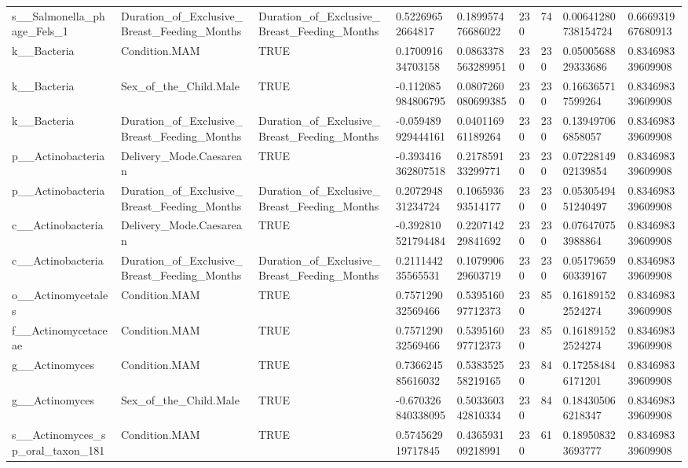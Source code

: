 \begin{longtable}{lllllllll}
s\_\_Salmonella\_phage\_Fels\_1 & Duration\_of\_Exclusive\_Breast\_Feeding\_Months & Duration\_of\_Exclusive\_Breast\_Feeding\_Months & 0.52269652664817 & 0.189957476686022 & 230 & 74 & 0.00641280738154724 & 0.666931967680913 \\
k\_\_Bacteria & Condition.MAM & TRUE & 0.170091634703158 & 0.0863378563289951 & 230 & 230 & 0.0500568829333686 & 0.834698339609908 \\
k\_\_Bacteria & Sex\_of\_the\_Child.Male & TRUE & -0.112085984806795 & 0.0807260080699385 & 230 & 230 & 0.166365717599264 & 0.834698339609908 \\
k\_\_Bacteria & Duration\_of\_Exclusive\_Breast\_Feeding\_Months & Duration\_of\_Exclusive\_Breast\_Feeding\_Months & -0.059489929444161 & 0.040116961189264 & 230 & 230 & 0.139497066858057 & 0.834698339609908 \\
p\_\_Actinobacteria & Delivery\_Mode.Caesarean & TRUE & -0.393416362807518 & 0.217859133299771 & 230 & 230 & 0.0722814902139854 & 0.834698339609908 \\
p\_\_Actinobacteria & Duration\_of\_Exclusive\_Breast\_Feeding\_Months & Duration\_of\_Exclusive\_Breast\_Feeding\_Months & 0.207294831234724 & 0.106593693514177 & 230 & 230 & 0.0530549451240497 & 0.834698339609908 \\
c\_\_Actinobacteria & Delivery\_Mode.Caesarean & TRUE & -0.392810521794484 & 0.220714229841692 & 230 & 230 & 0.076470753988864 & 0.834698339609908 \\
c\_\_Actinobacteria & Duration\_of\_Exclusive\_Breast\_Feeding\_Months & Duration\_of\_Exclusive\_Breast\_Feeding\_Months & 0.211144235565531 & 0.107990629603719 & 230 & 230 & 0.0517965960339167 & 0.834698339609908 \\
o\_\_Actinomycetales & Condition.MAM & TRUE & 0.757129032569466 & 0.539516097712373 & 230 & 85 & 0.161891522524274 & 0.834698339609908 \\
f\_\_Actinomycetaceae & Condition.MAM & TRUE & 0.757129032569466 & 0.539516097712373 & 230 & 85 & 0.161891522524274 & 0.834698339609908 \\
g\_\_Actinomyces & Condition.MAM & TRUE & 0.736624585616032 & 0.538352558219165 & 230 & 84 & 0.172584846171201 & 0.834698339609908 \\
g\_\_Actinomyces & Sex\_of\_the\_Child.Male & TRUE & -0.670326840338095 & 0.503360342810334 & 230 & 84 & 0.184305066218347 & 0.834698339609908 \\
s\_\_Actinomyces\_sp\_oral\_taxon\_181 & Condition.MAM & TRUE & 0.574562919717845 & 0.436593109218991 & 230 & 61 & 0.189508323693777 & 0.834698339609908 \\

\end{longtable}
